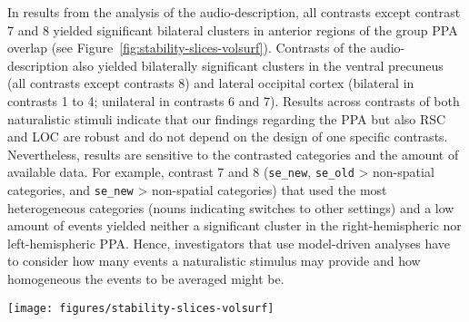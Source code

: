 \documentclass[english,11pt]{article}
\begin{document}

In results from the analysis of the audio-description, all contrasts except
contrast 7 and 8  yielded significant bilateral clusters in anterior regions of
the group PPA overlap (see Figure~\ref{fig:stability-slices-volsurf}).
Contrasts of the audio-description also yielded bilaterally significant clusters
in the ventral precuneus (all contrasts except contrasts 8) and lateral
occipital cortex (bilateral in contrasts 1 to 4; unilateral in contrasts 6 and
7).
Results across contrasts of both naturalistic stimuli indicate that our findings
regarding the PPA but also RSC and LOC are robust and do not depend on the
design of one specific contrasts.
Nevertheless, results are sensitive to the contrasted categories and the amount
of available data.
For example, contrast 7 and 8 (\texttt{se\_new}, \texttt{se\_old} > non-spatial
categories, and \texttt{se\_new} > non-spatial categories) that used the most
heterogeneous categories (nouns indicating switches to other settings) and a low
amount of events yielded neither a significant cluster in the right-hemispheric
nor left-hemispheric PPA.
Hence, investigators that use model-driven analyses have to consider how many
events a naturalistic stimulus may provide and how homogeneous the events to be
averaged might be.


\begin{figure*}[tbp]
\centering
    \texttt{[image: figures/stability-slices-volsurf]}
    \caption[Group results across contrasts of movie and audio-description]
    {Overlap of significant clusters ($Z$>3.4; $p$<.05, cluster
    corrected) across all contrasts for both naturalistic stimuli.
    The audio-description's contrasts 1-8 (blue)
    are overlaid over the audio-visual movie's contrasts 1-5 (red;
    see Table~5)
    . %
    a) results as brain slices on top of the MNI152 T1-weighted head template,
    with the acquisition field-of-view for the audio-description study
    highlighted.
    For comparison depicted as a black outline, the union of the
    individual PPA localizations reported by \citet{sengupta2016extension}
    that was spatially smoothed by applying a Gaussian kernel with full
    width at half maximum (FWHM) of \unit[2.0]{mm}.
    b) results projected onto the reconstructed
    surface of the MNI152 T1-weighted brain template.
    After projection, the union of individual PPA localizations was
    spatially smoothed by a Gaussian kernel with FWHM of \unit[2.0]{mm}
    }
    \label{fig:stability-slices-volsurf}
\end{figure*}
\end{document}
